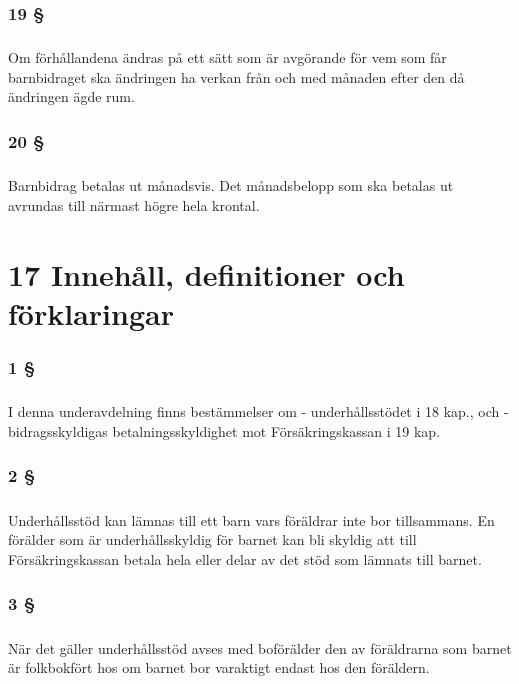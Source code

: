 \documentclass[a4paper,notitlepage,openany,10pt]{book}
\begin{document}
\subsection*{19 §}
\paragraph*{}
Om förhållandena ändras på ett sätt som är avgörande för vem som får barnbidraget ska ändringen ha verkan från och med månaden efter den då ändringen ägde rum.
\subsection*{20 §}
\paragraph*{}
Barnbidrag betalas ut månadsvis. Det månadsbelopp som ska betalas ut avrundas till närmast högre hela krontal.
\chapter*{17 Innehåll, definitioner och förklaringar}
\subsection*{1 §}
\paragraph*{}
I denna underavdelning finns bestämmelser om
\newline - underhållsstödet i 18 kap., och
\newline - bidragsskyldigas betalningsskyldighet mot Försäkringskassan i 19 kap.
\subsection*{2 §}
\paragraph*{}
Underhållsstöd kan lämnas till ett barn vars föräldrar inte bor tillsammans. En förälder som är underhållsskyldig för barnet kan bli skyldig att till Försäkringskassan betala hela eller delar av det stöd som lämnats till barnet.
\subsection*{3 §}
\paragraph*{}
När det gäller underhållsstöd avses med boförälder den av föräldrarna som barnet är folkbokfört hos om barnet bor varaktigt endast hos den föräldern.
\end{document}
